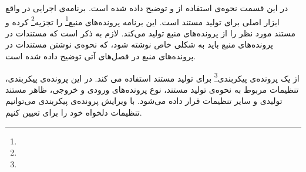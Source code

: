 %
% 
% 
% 
%
در این قسمت  نحوه‌ی استفاده از  و  توضیح داده شده است. 
برنامه‌ی اجرایی  در واقع ابزار اصلی برای تولید مستند است. این برنامه پرونده‌های منبع\footnote{} را تجزیه\footnote{}
 کرده و مستند مورد نظر را از پرونده‌های منبع تولید می‌کند. لازم به ذکر است که مستندات در پرونده‌های منبع باید 
به شکلی خاص نوشته شود، که نحوه‌ی نوشتن مستندات در پرونده‌های منبع در فصل‌های آتی توضیح داده شده است.

از یک پرونده‌ی پیکربندی\footnote{}
 برای تولید مستند استفاده می کند. در این پرونده‌ی پیکربندی، تنظیمات مربوط به نحوه‌ی تولید مستند، 
نوع پرونده‌های ورودی و خروجی، ظاهر مستند تولیدی و سایر تنظیمات قرار داده می‌شود. با ویرایش پرونده‌ی پیکربندی می‌توانیم تنظیمات 
دلخواه خود را برای  تعیین کنیم.

